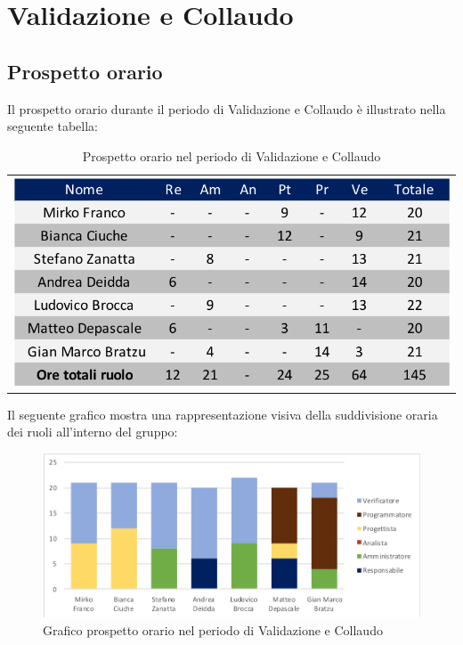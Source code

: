 \newpage
\section{Validazione e Collaudo}
\subsection{Prospetto orario}
Il prospetto orario durante il periodo di Validazione e Collaudo è illustrato nella seguente tabella:

\begin{table}[!ht]
	\begin{center}
		\begin{tabular}{c}
			\includegraphics[scale=0.90]{images/tabellaValidazioneCollaudo.png}
		\end{tabular}
		\caption{Prospetto orario nel periodo di Validazione e Collaudo}
	\end{center}
\end{table}

Il seguente grafico mostra una rappresentazione visiva della suddivisione oraria dei ruoli all'interno del gruppo:
\begin{figure}[!ht]
	\begin{center}
		\includegraphics[scale=0.90]{images/grafoValidazioneCollaudo.png}
		\caption{Grafico prospetto orario nel periodo di Validazione e Collaudo}
	\end{center}
\end{figure}

